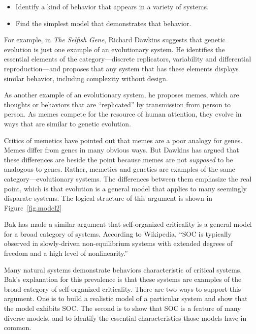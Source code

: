 \documentclass[10pt]{book}
\begin{document}
\begin{itemize}

\item Identify a kind of behavior that appears in a variety of
systems.

\item Find the simplest model that demonstrates that behavior.

\end{itemize}

For example, in {\em The Selfish Gene}, Richard Dawkins suggests that
genetic evolution is just one example of an evolutionary system.  He
identifies the essential elements of the category---discrete
replicators, variability and differential reproduction---and proposes
that any system that has these elements displays similar
behavior, including complexity without design.

As another example of an evolutionary system, he proposes memes, which
are thoughts or behaviors that are ``replicated'' by transmission from
person to person.  As memes compete for the resource of human
attention, they evolve in ways that are similar to genetic evolution.

Critics of memetics have pointed out that memes are a poor analogy
for genes.  Memes differ from genes in many obvious ways.  But
Dawkins has argued that these differences are beside the point
because memes are not {\em supposed} to be analogous to genes.
Rather, memetics and genetics are examples of the same
category---evolutionary systems.  The differences between them
emphasize the real point, which is that evolution is a general model
that applies to many seemingly disparate systems.  The logical
structure of this argument is shown in Figure~\ref{fig.model2}

Bak has made a similar argument that self-organized criticality is a
general model for a broad category of systems.  According to
Wikipedia, ``SOC is typically observed in slowly-driven
non-equilibrium systems with extended degrees of freedom and a high
level of nonlinearity.''

Many natural systems demonstrate behaviors characteristic of critical
systems.  Bak's explanation for this prevalence is that these systems
are examples of the broad category of self-organized criticality.
There are two ways to support this argument.  One is to build
a realistic model of a particular system and show that the model
exhibits SOC.  The second is to show that SOC is a feature of many
diverse models, and to identify the essential characteristics
those models have in common.
\end{document}
